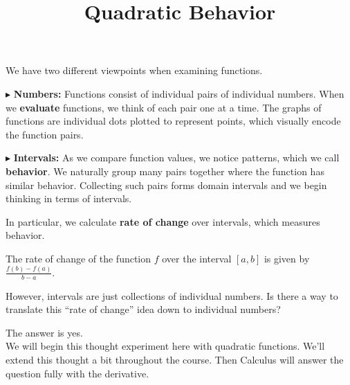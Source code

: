 \documentclass{ximera}
\title{Quadratic  Behavior}
\begin{document}
\begin{abstract}
\end{abstract}
\maketitle







We have two different viewpoints when examining functions.


$\blacktriangleright$ \textbf{Numbers:}  Functions consist of individual pairs of individual numbers.  When we \textbf{\textcolor{purple!85!blue}{evaluate}} functions, we think of each pair one at a time.  The graphs of functions are individual dots plotted to represent points, which visually encode the function pairs. 







$\blacktriangleright$ \textbf{Intervals:} As we compare function values, we notice patterns, which we call \textbf{\textcolor{purple!85!blue}{behavior}}. We naturally group many pairs together where the function has similar behavior.  Collecting such pairs forms domain intervals and we begin thinking in terms of intervals.





In particular, we calculate \textbf{\textcolor{blue!55!black}{rate of change}} over intervals, which measures behavior. 



The rate of change of the function $f$ over the interval $[a, b]$ is given by $\frac{f(b) - f(a)}{b - a}$.




However, intervals are just collections of individual numbers.  Is there a way to translate this ``rate of change'' idea down to individual numbers?

The answer is yes.  \\


We will begin this thought experiment here with quadratic functions. We'll extend this thought a bit throughout the course. Then Calculus will answer the question fully with the derivative.
\end{document}
